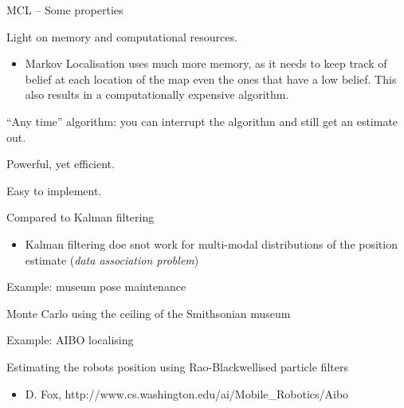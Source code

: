 \documentclass[compress]{beamer}
\begin{document}
\begin{frame}{MCL -- Some properties}

Light on memory and computational resources.

\begin{itemize}
\item Markov Localisation uses much more memory, as it needs to keep track
  of belief at each location of the map even the ones that have a low
  belief. This also results in a computationally expensive algorithm.
\end{itemize}

``Any time'' algorithm: you can interrupt the algorithm and still get an
estimate out.

Powerful, yet efficient.

Easy to implement.

Compared to Kalman filtering

    \begin{itemize}
        \item Kalman filtering doe snot work for multi-modal distributions of
            the position estimate (\emph{data association problem})
    \end{itemize}
\end{frame}

\begin{frame}{Example: museum pose maintenance}

Monte Carlo using the ceiling of the Smithsonian museum

    \begin{center}
    \end{center}

\end{frame}

\begin{frame}{Example: AIBO localising}

Estimating the robots position using Rao-Blackwellised particle filters

\begin{itemize}
\item D. Fox, http://www.cs.washington.edu/ai/Mobile\_Robotics/Aibo
\end{itemize}

\end{frame}
\end{document}
